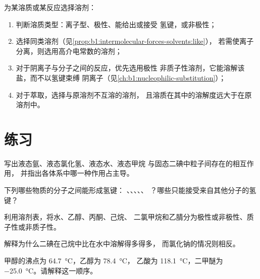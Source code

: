 \begin{method}[选择溶剂]\label{met:b1:intermolecular-forces-solvents:choose}
为某溶质或某反应选择溶剂：
\begin{enumerate}
  \item 判断溶质类型：离子型、极性、能给出或接受
        氢键，或非极性；
  \item 选择同类溶剂（见\cref{prop:b1:intermolecular-forces-solvents:like}），
        若需使离子分离，则选用高介电常数的溶剂；
  \item 对于阴离子与分子之间的反应，优先选用极性
        非质子性溶剂，它能溶解该盐，而不以氢键束缚
        阴离子（见\cref{ch:b1:nucleophilic-substitution}）；
  \item 对于萃取，选择与原溶剂不互溶的溶剂，
        且溶质在其中的溶解度远大于在原溶剂中。
\end{enumerate}
\end{method}

\section{练习}

\begin{exercise}[$\star$]\label{exo:b1:intermolecular-forces-solvents:1}
写出液态氩、液态氯化氢、液态水、液态甲烷
与固态二碘中粒子间存在的相互作用，
并指出各体系中哪一种作用占主导。
\end{exercise}

\begin{exercise}[$\star$]\label{exo:b1:intermolecular-forces-solvents:2}
下列哪些物质的分子之间能形成氢键：
、、、、、
？哪些只能接受来自其他分子的氢键？
\end{exercise}

\begin{exercise}[$\star$]\label{exo:b1:intermolecular-forces-solvents:3}
           利用溶剂表，将水、乙醇、丙酮、己烷、
           二氯甲烷和乙腈分为极性或非极性、质子性或非质子性。
\end{exercise}

\begin{exercise}[$\star$]\label{exo:b1:intermolecular-forces-solvents:4}
解释为什么二碘在己烷中比在水中溶解得多得多，
而氯化钠的情况则相反。
\end{exercise}

\begin{exercise}[$\star\star$]\label{exo:b1:intermolecular-forces-solvents:5}
甲醇的沸点为 \qty{64.7}{\celsius}，乙醇为 \qty{78.4}{\celsius}，
乙酸为 \qty{118.1}{\celsius}，二甲醚为
\qty{-25.0}{\celsius}。请解释这一顺序。
\end{exercise}

